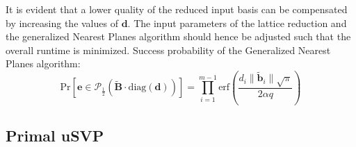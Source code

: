 It is evident that a lower quality of the reduced input basis can be compensated by increasing the values of $\mathbf{d}$. The input parameters of the lattice reduction and the generalized Nearest Planes algorithm should hence be adjusted such that the overall runtime is minimized. %
Success probability of the Generalized Nearest Planes algorithm:
\begin{equation}
  \text{Pr}\left[ \mathbf{e} \in \mathcal{P}_{\frac{1}{2}}(\tilde{\mathbf{B}} \cdot \text{diag}(\mathbf{d}))\right] = \prod_{i=1}^{m-1} \text{erf}\left(\frac{d_i \|\tilde{\mathbf{b}}_i\| \sqrt{\pi}}{2\alpha q}\right)
\end{equation} %






\subsection[Primal uSVP]{Primal uSVP \cite{ADPS16, BG14}} %






